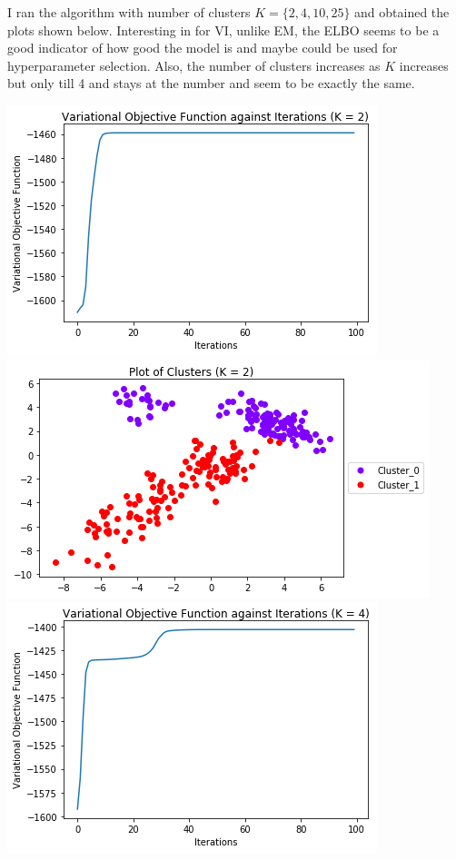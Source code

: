 \documentclass[twoside]{homework}
\begin{document}
I ran the algorithm with number of clusters $K = \{2, 4, 10, 25\} $ and obtained the plots shown below. Interesting in for VI, unlike EM, the ELBO seems to be a good indicator of how good the model is and maybe could be used for hyperparameter selection. Also, the number of clusters increases as $K$ increases but only till 4 and stays at the number and seem to be exactly the same.

\begin{centering}
\newpage
\includegraphics{VI_1}\\
\includegraphics{VI_Plot_1}\\
\newpage
\includegraphics{VI_2}\\

\end{centering}
\end{document}
